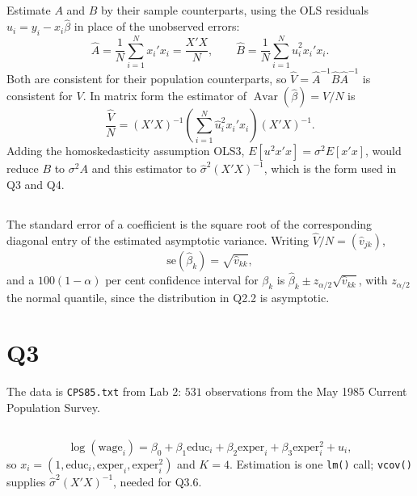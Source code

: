 \documentclass[11pt]{article}
\newcommand{\code}[1]{\texttt{#1}}
\DeclareMathOperator{\Avar}{Avar}
\begin{document}
\subsection{}
Estimate $A$ and $B$ by their sample counterparts, using the OLS residuals
$\hat{u}_i = y_i - x_i\hat\beta$ in place of the unobserved errors:
\[
\hat{A} = \frac{1}{N}\sum_{i=1}^{N} x_i'x_i = \frac{X'X}{N},
\qquad
\hat{B} = \frac{1}{N}\sum_{i=1}^{N} \hat{u}_i^2 x_i'x_i .
\]
Both are consistent for their population counterparts, so
$\hat{V} = \hat{A}^{-1}\hat{B}\hat{A}^{-1}$ is consistent for $V$. In matrix
form the estimator of $\Avar(\hat\beta) = V/N$ is
\[
\frac{\hat{V}}{N}
= (X'X)^{-1}\left(\sum_{i=1}^{N} \hat{u}_i^2 x_i'x_i\right)(X'X)^{-1}.
\]
Adding the homoskedasticity assumption OLS3, $E[u^2x'x] = \sigma^2E[x'x]$,
would reduce $B$ to $\sigma^2A$ and this estimator to
$\hat\sigma^2(X'X)^{-1}$, which is the form used in Q3 and Q4.

\subsection{}
The standard error of a coefficient is the square root of the corresponding
diagonal entry of the estimated asymptotic variance. Writing
$\hat{V}/N = (\hat{v}_{jk})$,
\[
\text{se}(\hat\beta_k) = \sqrt{\hat{v}_{kk}} ,
\]
and a $100(1-\alpha)$ per cent confidence interval for $\beta_k$ is
$\hat\beta_k \pm z_{\alpha/2}\sqrt{\hat{v}_{kk}}$, with $z_{\alpha/2}$ the
normal quantile, since the distribution in Q2.2 is asymptotic.

\clearpage
\section{Q3}
\label{sec:q3}

The data is \code{CPS85.txt} from Lab 2: $531$ observations from the May 1985
Current Population Survey.

\subsection{}
\[
\log(\text{wage}_i) = \beta_0 + \beta_1 \text{educ}_i + \beta_2 \text{exper}_i
 + \beta_3 \text{exper}_i^2 + u_i ,
\]
so $x_i = (1, \text{educ}_i, \text{exper}_i, \text{exper}_i^2)$ and $K = 4$.
Estimation is one \code{lm()} call; \code{vcov()} supplies
$\hat\sigma^2(X'X)^{-1}$, needed for Q3.6.
\end{document}
